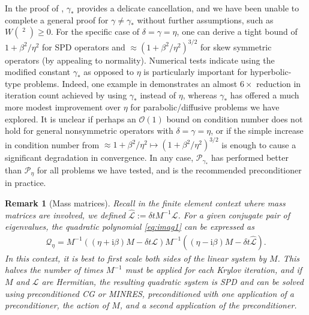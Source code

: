 \documentclass[a4paper,10pt]{article}
\newtheorem{remark}{Remark}
\DeclareMathOperator{\cL}{\widehat{\mathcal{L}}}
\begin{document}
In the proof of , $\gamma_*$ provides a delicate cancellation, and
we have been unable to complete a general proof for $\gamma\neq\gamma_*$ without
further assumptions, such as $W(\cL^2)\geq 0$. For the specific case of $\delta=
\gamma=\eta$, one can derive a tight bound of $1+\beta^2/\eta^2$ for SPD
operators and $\approx (1 + \beta^2/\eta^2)^{3/2}$ for skew symmetric operators
(by appealing to normality). Numerical tests indicate using the modified
constant $\gamma_*$ as opposed to $\eta$ is particularly important for
hyperbolic-type problems. Indeed, one example in 
demonstrates an almost $6\times$ reduction in iteration count achieved by using
$\gamma_*$ instead of $\eta$, whereas $\gamma_*$ has offered a much more modest
improvement over $\eta$ for parabolic/diffusive problems we have explored. It is
unclear if perhaps an $\mathcal{O}(1)$ bound on condition number does not hold
for general nonsymmetric operators with $\delta=\gamma=\eta$, or if the simple
increase in condition number from $\approx 1+\beta^2/\eta^2 \mapsto
(1+\beta^2/\eta^2)^{3/2}$ is enough to cause a significant degradation in
convergence. In any case, $\mathcal{P}_{\gamma_*}$ has performed better than
$\mathcal{P}_{\eta}$ for all problems we have tested, and is the recommended
preconditioner in practice. 

\begin{remark}[Mass matrices]
Recall in the finite element context where mass matrices are involved, we defined
$\widehat{\mathcal{L}} := \delta t M^{-1}\mathcal{L}$. For a given conjugate pair
of eigenvalues, the quadratic polynomial \eqref{eq:imag1} can be expressed as
%
\begin{align}\label{eq:scaleM}
\mathcal{Q}_\eta = M^{-1}((\eta + \mathrm{i} \beta)M - \delta t{\mathcal{L}})M^{-1}((\eta - \mathrm{i} \beta)M -
	\delta t\widehat{\mathcal{L}}).
\end{align}
%
In this context, it is best to first scale both sides of the linear system by $M$.
This halves the number of times $M^{-1}$ must be applied for each Krylov iteration,
and if $M$ and $\mathcal{L}$ are Hermitian, the resulting quadratic system is SPD
and can be solved using preconditioned CG or MINRES, preconditioned
with one application of a preconditioner, the action of $M$, and a second application
of the preconditioner.
\end{remark}
\end{document}
